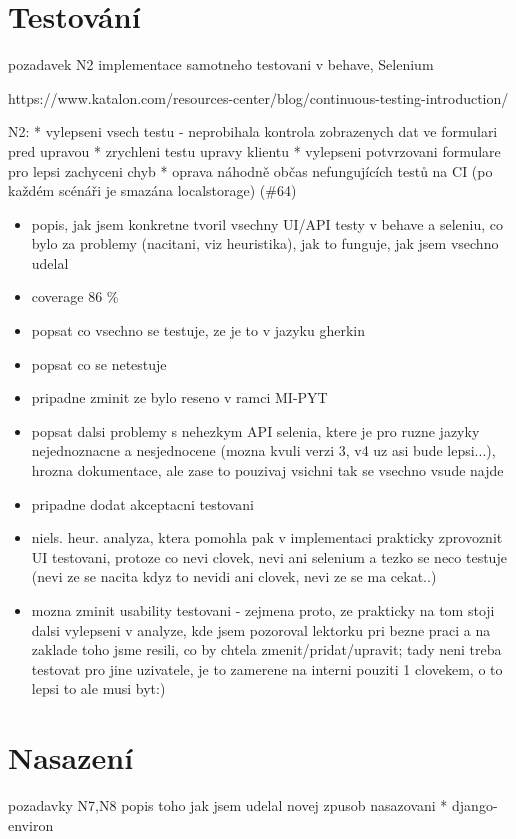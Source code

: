 \chapter{Testování}
pozadavek N2
implementace samotneho testovani v behave, Selenium

https://www.katalon.com/resources-center/blog/continuous-testing-introduction/

N2: 
* vylepseni vsech testu - neprobihala kontrola zobrazenych dat ve formulari pred upravou
* zrychleni testu upravy klientu
* vylepseni potvrzovani formulare pro lepsi zachyceni chyb
* oprava náhodně občas nefungujících testů na CI (po každém scénáři je smazána localstorage) (\#64)

\begin{itemize}
\item popis, jak jsem konkretne tvoril vsechny UI/API testy v behave a seleniu, co bylo za problemy (nacitani, viz heuristika), jak to funguje, jak jsem vsechno udelal
\item coverage 86 \%
\item popsat co vsechno se testuje, ze je to v jazyku gherkin
\item popsat co se netestuje
\item pripadne zminit ze bylo reseno v ramci MI-PYT
\item popsat dalsi problemy s nehezkym API selenia, ktere je pro ruzne jazyky nejednoznacne a nesjednocene (mozna kvuli verzi 3, v4 uz asi bude lepsi...), hrozna dokumentace, ale zase to pouzivaj vsichni tak se vsechno vsude najde
\item pripadne dodat akceptacni testovani
\item niels. heur. analyza, ktera pomohla pak v implementaci prakticky zprovoznit UI testovani, protoze co nevi clovek, nevi ani selenium a tezko se neco testuje (nevi ze se nacita kdyz to nevidi ani clovek, nevi ze se ma cekat..)
\item mozna zminit usability testovani - zejmena proto, ze prakticky na tom stoji dalsi vylepseni v analyze, kde jsem pozoroval lektorku pri bezne praci a na zaklade toho jsme resili, co by chtela zmenit/pridat/upravit; tady neni treba testovat pro jine uzivatele, je to zamerene na interni pouziti 1 clovekem, o to lepsi to ale musi byt:)
\end{itemize}


\chapter{Nasazení}
pozadavky N7,N8
popis toho jak jsem udelal novej zpusob nasazovani
* django-environ


